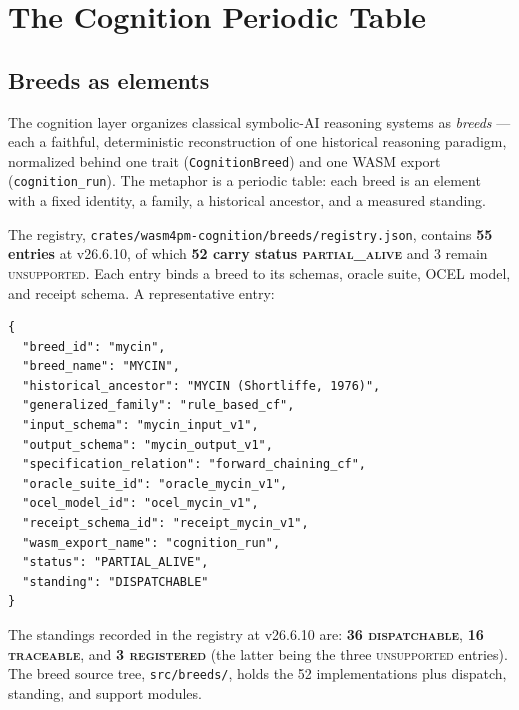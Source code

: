 \documentclass[11pt,oneside]{report}
\newcommand{\projver}{v26.6.10}
\begin{document}
\chapter{The Cognition Periodic Table}
\label{ch:periodic}

\section{Breeds as elements}

The cognition layer organizes classical symbolic-AI reasoning systems as
\emph{breeds} --- each a faithful, deterministic reconstruction of one
historical reasoning paradigm, normalized behind one trait
(\texttt{CognitionBreed}) and one WASM export (\texttt{cognition\_run}).
The metaphor is a periodic table: each breed is an element with a fixed
identity, a family, a historical ancestor, and a measured standing.

The registry, \texttt{crates/wasm4pm-cognition/breeds/registry.json},
contains \textbf{55 entries} at \projver{}, of which \textbf{52 carry
status \textsc{partial\_alive}} and 3 remain \textsc{unsupported}. Each
entry binds a breed to its schemas, oracle suite, OCEL model, and receipt
schema. A representative entry:

\begin{lstlisting}[language={}]
{
  "breed_id": "mycin",
  "breed_name": "MYCIN",
  "historical_ancestor": "MYCIN (Shortliffe, 1976)",
  "generalized_family": "rule_based_cf",
  "input_schema": "mycin_input_v1",
  "output_schema": "mycin_output_v1",
  "specification_relation": "forward_chaining_cf",
  "oracle_suite_id": "oracle_mycin_v1",
  "ocel_model_id": "ocel_mycin_v1",
  "receipt_schema_id": "receipt_mycin_v1",
  "wasm_export_name": "cognition_run",
  "status": "PARTIAL_ALIVE",
  "standing": "DISPATCHABLE"
}
\end{lstlisting}

The standings recorded in the registry at \projver{} are: \textbf{36
\textsc{dispatchable}}, \textbf{16 \textsc{traceable}}, and \textbf{3
\textsc{registered}} (the latter being the three \textsc{unsupported}
entries). The breed source tree, \texttt{src/breeds/}, holds the 52
implementations plus dispatch, standing, and support modules.
\end{document}
